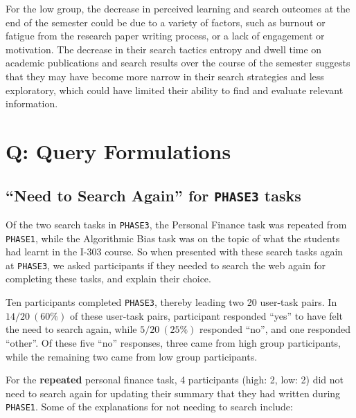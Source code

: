 \documentclass[letterpaper, nobind]{templates/ociamthesis}
\begin{document}
For the low group, the decrease in perceived learning and search outcomes at the end of the semester could be due to a variety of factors, such as burnout or fatigue from the research paper writing process, or a lack of engagement or motivation. The decrease in their search tactics entropy and dwell time on academic publications and search results over the course of the semester suggests that they may have become more narrow in their search strategies and less exploratory, which could have limited their ability to find and evaluate relevant information.

\hypertarget{q-query-formulations-1}{%
\section{Q: Query Formulations}\label{q-query-formulations-1}}

\hypertarget{sec-res13-need-to-search}{%
\subsection{\texorpdfstring{``Need to Search Again'' for \texttt{PHASE3} tasks}{``Need to Search Again'' for PHASE3 tasks}}\label{sec-res13-need-to-search}}

Of the two search tasks in \texttt{PHASE3}, the Personal Finance task was repeated from \texttt{PHASE1}, while the Algorithmic Bias task was on the topic of what the students had learnt in the I-303 course.
So when presented with these search tasks again at \texttt{PHASE3}, we asked participants if they needed to search the web again for completing these tasks, and explain their choice.

Ten participants completed \texttt{PHASE3}, thereby leading two 20 user-task pairs.
In \(14 / 20 ~ (60\%)\) of these user-task pairs, participant responded ``yes'' to have felt the need to search again, while \(5 / 20 ~ (25\%)\) responded ``no'', and one responded ``other''.
Of these five ``no'' responses, three came from high group participants, while the remaining two came from low group participants.

For the \textbf{repeated} personal finance task, 4 participants (high: 2, low: 2) did not need to search again for updating their summary that they had written during \texttt{PHASE1}.
Some of the explanations for not needing to search include:
\end{document}
